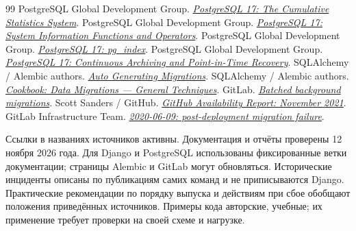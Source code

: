 \documentclass[11pt,a4paper]{article}
\begin{document}
\begin{thebibliography}{99}
 PostgreSQL Global Development Group. \href{https://www.postgresql.org/docs/17/monitoring-stats.html}{\textit{PostgreSQL 17: The Cumulative Statistics System}}.
 PostgreSQL Global Development Group. \href{https://www.postgresql.org/docs/17/functions-info.html}{\textit{PostgreSQL 17: System Information Functions and Operators}}.
 PostgreSQL Global Development Group. \href{https://www.postgresql.org/docs/17/catalog-pg-index.html}{\textit{PostgreSQL 17: pg\_index}}.
 PostgreSQL Global Development Group. \href{https://www.postgresql.org/docs/17/continuous-archiving.html}{\textit{PostgreSQL 17: Continuous Archiving and Point-in-Time Recovery}}.
 SQLAlchemy / Alembic authors. \href{https://alembic.sqlalchemy.org/en/latest/autogenerate.html}{\textit{Auto Generating Migrations}}.
 SQLAlchemy / Alembic authors. \href{https://alembic.sqlalchemy.org/en/latest/cookbook.html#data-migrations-general-techniques}{\textit{Cookbook: Data Migrations --- General Techniques}}.
 GitLab. \href{https://docs.gitlab.com/development/database/batched_background_migrations/}{\textit{Batched background migrations}}.
 Scott Sanders / GitHub. \href{https://github.blog/news-insights/company-news/github-availability-report-november-2021/}{\textit{GitHub Availability Report: November 2021}}.
 GitLab Infrastructure Team. \href{https://gitlab.com/gitlab-com/gl-infra/production/-/issues/2251}{\textit{2020-06-09: post-deployment migration failure}}.

\end{thebibliography}
\small
Ссылки в названиях источников активны. Документация и отчёты проверены 12 ноября 2026 года. Для Django и PostgreSQL использованы фиксированные ветки документации; страницы Alembic и GitLab могут обновляться. Исторические инциденты описаны по публикациям самих команд и не приписываются Django. Практические рекомендации по порядку выпуска и действиям при сбое обобщают положения приведённых источников. Примеры кода авторские, учебные; их применение требует проверки на своей схеме и нагрузке.
\end{document}
